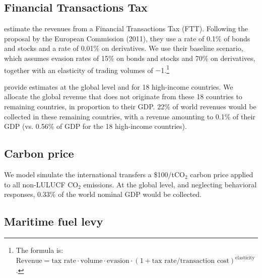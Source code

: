 \documentclass[12pt,english]{article}
\begin{document}
\begin{bibunit}
\subsection*{Financial Transactions Tax}\label{sec:ftt}

\cite{pekanov_global_2019} estimate the revenues from a Financial Transactions Tax (FTT). Following the proposal by the European Commission (2011), they use a rate of 0.1\% of bonds and stocks and a rate of 0.01\% on derivatives. We use their baseline scenario, which assumes evasion rates of 15\% on bonds and stocks and 70\% on derivatives, together with an elasticity of trading volumes of $-$1.\footnote{The formula is: $\text{Revenue} = \text{tax rate} \cdot \text{volume} \cdot \text{evasion} \cdot \left(1 + \text{tax rate} / \text{transaction cost}\right)^\text{elasticity}$.} 

\cite{pekanov_global_2019} provide estimates at the global level and for 18 high-income countries. We allocate the global revenue that does not originate from these 18 countries to remaining countries, in proportion to their GDP. 22\% of world revenues would be collected in these remaining countries, with a revenue amounting to 0.1\% of their GDP (vs. 0.56\% of GDP for the 18 high-income countries).


\subsection*{Carbon price}\label{sec:carbon}

We model simulate the international transfers a \$100/tCO$_\text{2}$ carbon price applied to all non-LULUCF CO$_\text{2}$ emissions. At the global level, and neglecting behavioral responses, 0.33\% of the world nominal GDP would be collected. 

\subsection*{Maritime fuel levy}\label{sec:wealth}


\end{bibunit}
\end{document}
